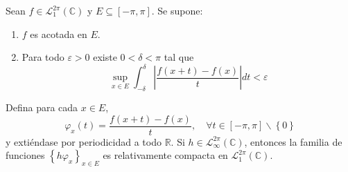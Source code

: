 \documentclass[12pt]{report}
\theoremstyle{largebreak}
\newcommand\abs[1]{\ensuremath{\left|#1\right|}}
\begin{document}
    \begin{lema}
        Sean $f\in\mathcal{L}_1^{2\pi}(\mathbb{C})$ y $E\subseteq[-\pi,\pi]$. Se supone:
        \begin{enumerate}
            \item $f$ es acotada en $E$.
            \item Para todo $\varepsilon>0$ existe $0<\delta<\pi$ tal que
            \begin{equation*}
                \sup_{ x\in E}\int_{-\delta}^{\delta}\abs{\frac{f(x+t)-f(x)}{t}}dt<\varepsilon
            \end{equation*}
        \end{enumerate}
        Defina para cada $x\in E$,
        \begin{equation*}
            \varphi_x(t)=\frac{f(x+t)-f(x)}{t},\quad\forall t\in[-\pi,\pi]\backslash\left\{0 \right\}
        \end{equation*}
        y extiéndase por periodicidad a todo $\mathbb{R}$. Si $h\in\mathcal{L}_{\infty}^{2\pi}(\mathbb{C})$, entonces la familia de funciones $\left\{h\varphi_x \right\}_{x\in E}$ es relativamente compacta en $\mathcal{L}_1^{2\pi}(\mathbb{C})$.
    \end{lema}
\end{document}
